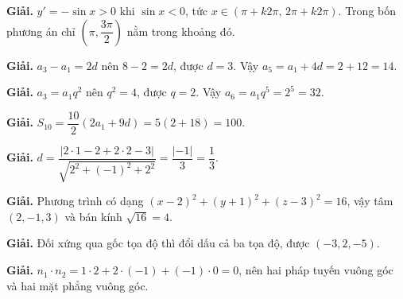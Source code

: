 \documentclass[11pt, a4paper]{article}
\begin{document}
\vspace{0.3cm}
\begin{dapan}[15 — Đáp án C]

\textbf{Giải.} $y'=-\sin x>0$ khi $\sin x<0$, tức $x \in (\pi+k2\pi,\, 2\pi+k2\pi)$. Trong bốn phương án chỉ $\left( \pi, \dfrac{3\pi}{2} \right)$ nằm trong khoảng đó.


\end{dapan}
\vspace{0.3cm}
\begin{dapan}[16 — Đáp án B]

\textbf{Giải.} $a_3-a_1=2d$ nên $8-2=2d$, được $d=3$. Vậy $a_5=a_1+4d=2+12=14$.


\end{dapan}
\vspace{0.3cm}
\begin{dapan}[17 — Đáp án D]

\textbf{Giải.} $a_3=a_1q^2$ nên $q^2=4$, được $q=2$. Vậy $a_6=a_1q^5=2^5=32$.


\end{dapan}
\vspace{0.3cm}
\begin{dapan}[18 — Đáp án D]

\textbf{Giải.} $S_{10}=\dfrac{10}{2}\left( 2a_1+9d \right)=5(2+18)=100$.


\end{dapan}
\vspace{0.3cm}
\begin{dapan}[19 — Đáp án D]

\textbf{Giải.} $d=\dfrac{\lvert 2 \cdot 1-2+2 \cdot 2-3 \rvert}{\sqrt{2^2+(-1)^2+2^2}}=\dfrac{\lvert -1 \rvert}{3}=\dfrac{1}{3}$.


\end{dapan}
\vspace{0.3cm}
\begin{dapan}[20 — Đáp án D]

\textbf{Giải.} Phương trình có dạng $(x-2)^2+(y+1)^2+(z-3)^2=16$, vậy tâm $(2,-1,3)$ và bán kính $\sqrt{16}=4$.


\end{dapan}
\vspace{0.3cm}
\begin{dapan}[21 — Đáp án C]

\textbf{Giải.} Đối xứng qua gốc tọa độ thì đổi dấu cả ba tọa độ, được $(-3,2,-5)$.


\end{dapan}
\vspace{0.3cm}
\begin{dapan}[22 — Đáp án B]

\textbf{Giải.} $n_1 \cdot n_2=1 \cdot 2+2 \cdot (-1)+(-1) \cdot 0=0$, nên hai pháp tuyến vuông góc và hai mặt phẳng vuông góc.


\end{dapan}
\end{document}
